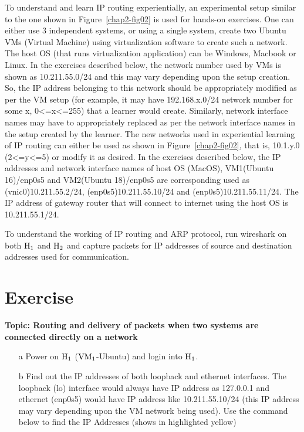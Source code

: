 \begin{multicols}{2}
To understand and learn IP routing experientially, an experimental setup similar to the one shown in Figure~\ref{chap2-fig02} is used for hands-on exercises. One can either use 3 independent systems, or using a single system, create two Ubuntu VMs (Virtual Machine) using virtualization software \cite{art2-key07}\cite{art2-key08}\cite{art2-key09} to create such a network. The host OS (that runs virtualization application) can be Windows, Macbook or Linux. In the exercises described below, the network number used by VMs is shown as 10.211.55.0/24 and this may vary depending upon the setup creation. So, the IP address belonging to this network should be appropriately modified as per the VM setup (for example, it may have 192.168.x.0/24 network number for some x, 0<=x<=255) that a learner would create. Similarly, network interface names may have to appropriately replaced as per the network interface names in the setup created by the learner. The new networks used in experiential learning of IP routing can either be used as shown in Figure~\ref{chap2-fig02}, that is, 10.1.y.0 (2<=y<=5) or modify it as desired. In the exercises described below, the IP addresses and network interface names of host OS (MacOS), VM1(Ubuntu 16)/enp0s5 and VM2(Ubuntu 18)/enp0s5 are corresponding used as (vnic0)10.211.55.2/24, (enp0s5)10.211.55.10/24 and (enp0s5)10.211.55.11/24. The IP address of gateway router that will connect to internet using the host OS is 10.211.55.1/24.

To understand the working of IP routing and ARP protocol, run wireshark on both ${\rm H}_{1}$ and ${\rm H}_{2}$ and capture packets for IP addresses of source and destination addresses used for communication.


\section*{Exercise \label{chap2-exe1}}

\textbf{Topic: Routing and delivery of packets when two systems are connected directly on a network}

\vspace{-.5cm}

\begin{itemize}
\item[a] Power on ${\rm H}_{1}$ (${\rm VM}_{1}$-Ubuntu) and login into ${\rm H}_{1}$.
\item[b] Find out the IP addresses of both loopback and ethernet interfaces. The loopback (lo) interface would always have IP address as 127.0.0.1 and ethernet (enp0s5) would have IP address like 10.211.55.10/24 (this IP address may vary depending upon the VM network being used). Use the command below to find the IP Addresses (shows in highlighted yellow)


\end{itemize}
\end{multicols}
